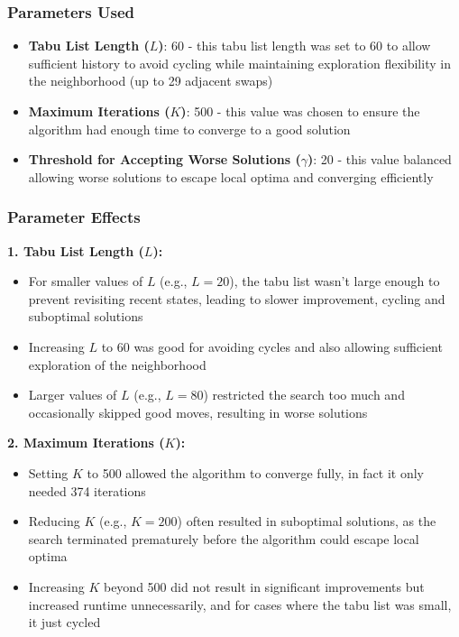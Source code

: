 \documentclass[fleqn]{article}
\begin{document}
    \subsubsection*{Parameters Used}
    \begin{itemize}
        \item \textbf{Tabu List Length ($L$)}: 60 - this tabu list length was set to 60 to allow sufficient history to avoid cycling while maintaining exploration flexibility in the neighborhood (up to 29 adjacent swaps)
        \item \textbf{Maximum Iterations ($K$)}: 500 - this value was chosen to ensure the algorithm had enough time to converge to a good solution
        \item \textbf{Threshold for Accepting Worse Solutions ($\gamma$)}: 20 - this value balanced allowing worse solutions to escape local optima and converging efficiently
    \end{itemize}

    \subsubsection*{Parameter Effects}
    \textbf{1. Tabu List Length ($L$):}
    \begin{itemize}
        \item For smaller values of $L$ (e.g., $L=20$), the tabu list wasn't large enough to prevent revisiting recent states, leading to slower improvement, cycling and suboptimal solutions
        \item Increasing $L$ to 60 was good for avoiding cycles and also allowing sufficient exploration of the neighborhood
        \item Larger values of $L$ (e.g., $L=80$) restricted the search too much and occasionally skipped good moves, resulting in worse solutions
    \end{itemize}

    \textbf{2. Maximum Iterations ($K$):}
    \begin{itemize}
        \item Setting $K$ to 500 allowed the algorithm to converge fully, in fact it only needed 374 iterations
        \item Reducing $K$ (e.g., $K=200$) often resulted in suboptimal solutions, as the search terminated prematurely before the algorithm could escape local optima
        \item Increasing $K$ beyond 500 did not result in significant improvements but increased runtime unnecessarily, and for cases where the tabu list was small, it just cycled
    \end{itemize}
\end{document}
